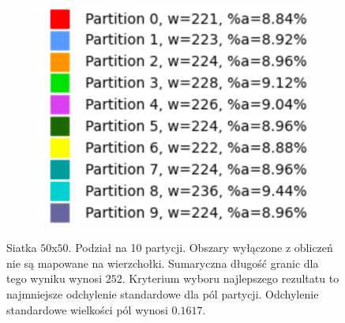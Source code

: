 \begin{figure}[h]
\begin{subfigure}{.33\textwidth}
    \centering
    \includegraphics[width=0.9\linewidth]{images/results/m_k/with/14/results}
    \caption[short]{}
\end{subfigure}
\caption{Siatka $50$x$50$. Podział na 10 partycji.
Obszary wyłączone z obliczeń nie są mapowane na wierzchołki.
Sumaryczna długość granic dla tego wyniku wynosi $252$.
Kryterium wyboru najlepszego rezultatu to najmniejsze odchylenie standardowe dla pól partycji.
Odchylenie standardowe wielkości pól wynosi $0.1617$.}
\label{result:14}
\end{figure}
